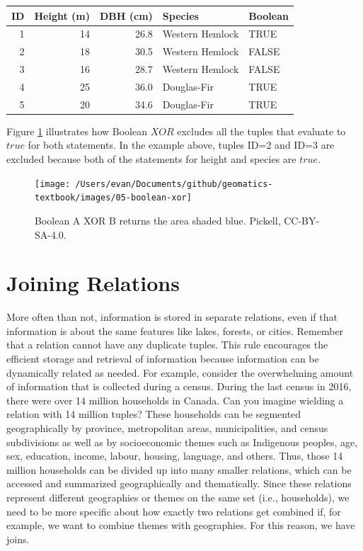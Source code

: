 \documentclass[
]{book}
\begin{document}
\begin{tabular}{rrrll}
\toprule
ID & Height (m) & DBH (cm) & Species & Boolean\\
\midrule
1 & 14 & 26.8 & Western Hemlock & TRUE\\
2 & 18 & 30.5 & Western Hemlock & FALSE\\
3 & 16 & 28.7 & Western Hemlock & FALSE\\
4 & 25 & 36.0 & Douglas-Fir & TRUE\\
5 & 20 & 34.6 & Douglas-Fir & TRUE\\
\bottomrule
\end{tabular}

Figure \ref{fig:5-boolean-xor} illustrates how Boolean \(XOR\) excludes all the tuples that evaluate to \(true\) for both statements. In the example above, tuples ID=2 and ID=3 are excluded because both of the statements for height and species are \(true\).

\begin{figure}
\texttt{[image: /Users/evan/Documents/github/geomatics-textbook/images/05-boolean-xor]} \caption{Boolean A XOR B returns the area shaded blue. Pickell, CC-BY-SA-4.0.}\label{fig:5-boolean-xor}
\end{figure}

\hypertarget{joining-relations}{%
\section{Joining Relations}\label{joining-relations}}

More often than not, information is stored in separate relations, even if that information is about the same features like lakes, forests, or cities. Remember that a relation cannot have any duplicate tuples. This rule encourages the efficient storage and retrieval of information because information can be dynamically related as needed. For example, consider the overwhelming amount of information that is collected during a census. During the last census in 2016, there were over 14 million households in Canada. Can you imagine wielding a relation with 14 million tuples? These households can be segmented geographically by province, metropolitan areas, municipalities, and census subdivisions as well as by socioeconomic themes such as Indigenous peoples, age, sex, education, income, labour, housing, language, and others. Thus, those 14 million households can be divided up into many smaller relations, which can be accessed and summarized geographically and thematically. Since these relations represent different geographies or themes on the same set (i.e., households), we need to be more specific about how exactly two relations get combined if, for example, we want to combine themes with geographies. For this reason, we have joins.
\end{document}
